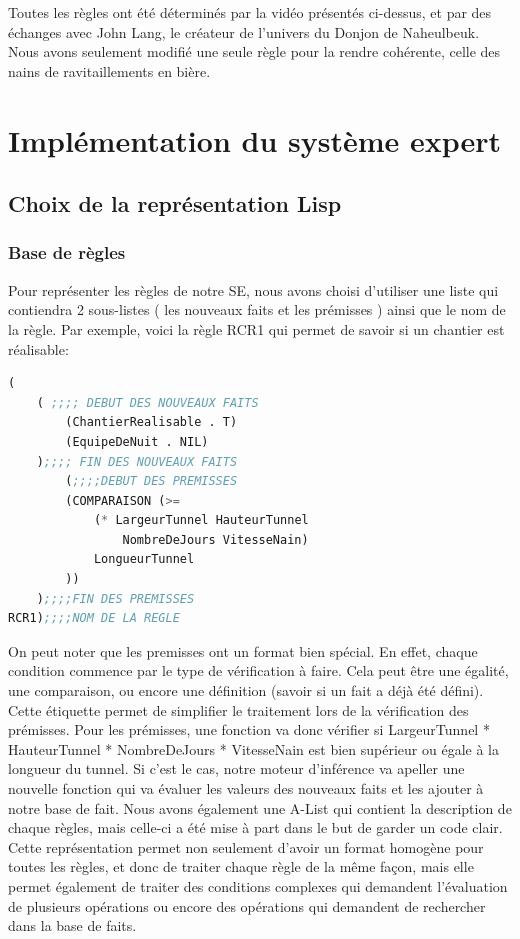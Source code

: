\documentclass[a4paper,10pt]{report}
\begin{document}
Toutes les règles ont été déterminés par la vidéo présentés ci-dessus, et par des échanges avec John Lang, le créateur de l’univers du Donjon de Naheulbeuk. Nous avons seulement modifié une seule règle pour la rendre cohérente, celle des nains de ravitaillements en bière. 



\chapter{Implémentation du système expert}
  \section{Choix de la représentation Lisp}
    \subsection{Base de règles}
    Pour représenter les règles de notre SE, nous avons choisi d'utiliser une liste qui contiendra 2 sous-listes ( les nouveaux faits et les prémisses )
    ainsi que le nom de la règle. Par exemple, voici la règle RCR1 qui permet de savoir si un chantier est réalisable:\newline
    \begin{lstlisting}[language=Lisp]
(
	( ;;;; DEBUT DES NOUVEAUX FAITS
		(ChantierRealisable . T)
		(EquipeDeNuit . NIL)
	);;;; FIN DES NOUVEAUX FAITS
		(;;;;DEBUT DES PREMISSES
		(COMPARAISON (>=
			(* LargeurTunnel HauteurTunnel
			    NombreDeJours VitesseNain)
			LongueurTunnel
		))
	);;;;FIN DES PREMISSES
RCR1);;;;NOM DE LA REGLE

    \end{lstlisting}

    On peut noter que les premisses ont un format bien spécial. En effet, chaque condition commence par le type de vérification à faire. Cela peut être une égalité,
    une comparaison, ou encore une définition (savoir si un fait a déjà été défini). Cette étiquette permet de simplifier le traitement lors de la vérification
    des prémisses. Pour les prémisses, une fonction va donc vérifier si LargeurTunnel * HauteurTunnel * NombreDeJours * VitesseNain est bien supérieur ou égale à la
    longueur du tunnel. Si c'est le cas, notre moteur d'inférence va apeller une nouvelle fonction qui va évaluer les valeurs des nouveaux faits et les ajouter à
    notre base de fait. Nous avons également une A-List qui contient la description de chaque règles, mais celle-ci a été mise à part dans le but de garder un code
    clair. Cette représentation permet non seulement d'avoir un format homogène pour toutes les règles, et donc de traiter chaque règle de la même façon, mais elle
    permet également de traiter des conditions complexes qui demandent l'évaluation de plusieurs opérations ou encore des opérations qui demandent de rechercher
    dans la base de faits.
\end{document}
